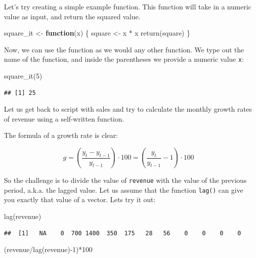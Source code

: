\documentclass[
  12pt,
  oneside]{book}
\newenvironment{Shaded}{\begin{snugshade}}{\end{snugshade}}
\newcommand{\ControlFlowTok}[1]{\textcolor[rgb]{0.13,0.29,0.53}{\textbf{#1}}}
\newcommand{\DecValTok}[1]{\textcolor[rgb]{0.00,0.00,0.81}{#1}}
\newcommand{\FunctionTok}[1]{\textcolor[rgb]{0.00,0.00,0.00}{#1}}
\newcommand{\NormalTok}[1]{#1}
\newcommand{\OtherTok}[1]{\textcolor[rgb]{0.56,0.35,0.01}{#1}}
\newcommand{\SpecialCharTok}[1]{\textcolor[rgb]{0.00,0.00,0.00}{#1}}
\theoremstyle{definition}
\theoremstyle{definition}
\theoremstyle{definition}
\theoremstyle{definition}
\theoremstyle{remark}
\begin{document}
Let's try creating a simple example function. This function will take in a numeric value as input, and return the squared value.

\begin{Shaded}
\begin{Highlighting}[]
\NormalTok{square\_it }\OtherTok{\textless{}{-}} \ControlFlowTok{function}\NormalTok{(x) \{ }
\NormalTok{   square }\OtherTok{\textless{}{-}}\NormalTok{ x }\SpecialCharTok{*}\NormalTok{ x}
   \FunctionTok{return}\NormalTok{(square)}
\NormalTok{\} }
\end{Highlighting}
\end{Shaded}

Now, we can use the function as we would any other function. We type out the name of the function, and inside the parentheses we provide a numeric value \texttt{x}:

\begin{Shaded}
\begin{Highlighting}[]
\FunctionTok{square\_it}\NormalTok{(}\DecValTok{5}\NormalTok{)}
\end{Highlighting}
\end{Shaded}

\begin{verbatim}
## [1] 25
\end{verbatim}

Let us get back to script with sales and try to calculate the monthly growth rates of revenue using a self-written function.

The formula of a growth rate is clear:

\[ g=\left(\frac{y_t-y_{t-1}}{y_{t-1}}\right)\cdot 100=\left(\frac{y_t}{y_{t-1}}-1\right)\cdot 100 \]

So the challenge is to divide the value of \texttt{revenue} with the value of the previous period, a.k.a. the lagged value. Let us assume that the function \texttt{lag()} can give you exactly that value of a vector. Lets try it out:

\begin{Shaded}
\begin{Highlighting}[]
\FunctionTok{lag}\NormalTok{(revenue)}
\end{Highlighting}
\end{Shaded}

\begin{verbatim}
##  [1]   NA    0  700 1400  350  175   28   56    0    0    0    0
\end{verbatim}

\begin{Shaded}
\begin{Highlighting}[]
\NormalTok{(revenue}\SpecialCharTok{/}\FunctionTok{lag}\NormalTok{(revenue)}\SpecialCharTok{{-}}\DecValTok{1}\NormalTok{)}\SpecialCharTok{*}\DecValTok{100} 
\end{Highlighting}
\end{Shaded}
\end{document}
